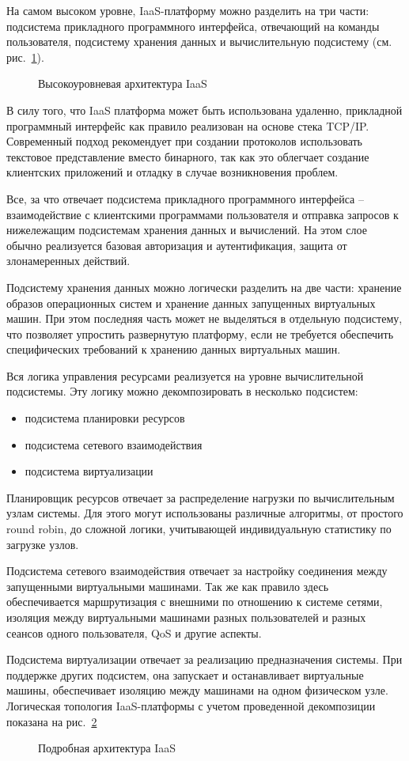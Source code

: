 На самом высоком уровне, IaaS-платформу можно разделить на три части: 
подсистема прикладного программного интерфейса, отвечающий на команды пользователя,
подсистему хранения данных и вычислительную подсистему (см. рис.~\ref{fig:iaas-birdsview}).
\begin{figure}
  \centering
  {\small}
  \caption{Высокоуровневая архитектура IaaS}
  \label{fig:iaas-birdsview}
\end{figure} 

В силу того, что IaaS платформа может быть использована удаленно, прикладной программный
интерфейс как правило реализован на основе стека TCP/IP. Современный подход рекомендует
при создании протоколов использовать текстовое представление вместо бинарного, так как
это облегчает создание клиентских приложений и отладку в случае возникновения проблем.

Все, за что отвечает подсистема прикладного программного интерфейса -- взаимодействие
с клиентскими программами пользователя и отправка запросов к нижележащим подсистемам
хранения данных и вычислений. На этом слое обычно реализуется базовая авторизация и 
аутентификация, защита от злонамеренных действий. %

Подсистему хранения данных можно логически разделить на две части: хранение образов
операционных систем и хранение данных запущенных виртуальных машин.
При этом последняя часть может не выделяться в отдельную подсистему, что позволяет
упростить развернутую платформу, если не требуется обеспечить специфических 
требований к хранению данных виртуальных машин.

Вся логика управления ресурсами реализуется на уровне вычислительной подсистемы.
Эту логику можно декомпозировать в несколько подсистем:
\begin{itemize}
    \item подсистема планировки ресурсов
    \item подсистема сетевого взаимодействия
    \item подсистема виртуализации
\end{itemize}
Планировщик ресурсов отвечает за распределение нагрузки по вычислительным узлам
системы. Для этого могут использованы различные алгоритмы, от простого round robin,
до сложной логики, учитывающей индивидуальную статистику по загрузке узлов.

Подсистема сетевого взаимодействия отвечает за настройку соединения между запущенными 
виртуальными машинами. Так же как правило здесь обеспечивается маршрутизация
с внешними по отношению к системе сетями, изоляция между виртуальными машинами
разных пользователей и разных сеансов одного пользователя, QoS и другие аспекты.

Подсистема виртуализации отвечает за реализацию предназначения системы.
При поддержке других подсистем, она запускает и останавливает виртуальные машины, 
обеспечивает изоляцию между машинами на одном физическом узле. 
Логическая топология IaaS-платформы с учетом проведенной декомпозиции показана на рис.~\ref{fig:iaas-lowlevel}
\begin{figure}
  \centering
  {\footnotesize}
  \caption{Подробная архитектура IaaS}
  \label{fig:iaas-lowlevel}
\end{figure} 
